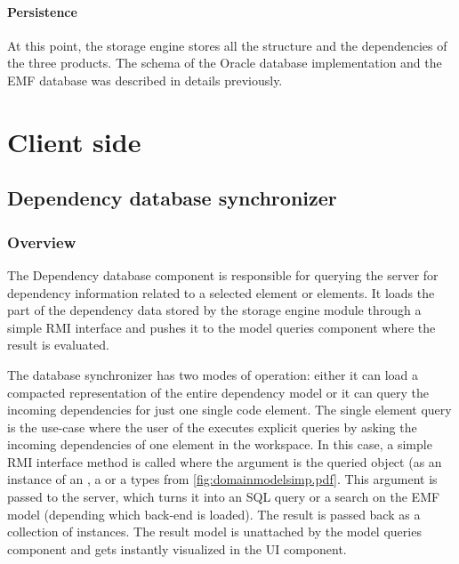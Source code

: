 \paragraph{Persistence}
At this point, the storage engine stores all the structure and the dependencies 
of the three products. The schema of the Oracle database implementation and the EMF
database was described in details previously.



\section{Client side}
\subsection{Dependency database synchronizer}
\label{sect:depdbsynch}

\subsubsection{Overview}
The Dependency database component is responsible for querying the server for
dependency information related to a selected element or elements. It loads the
part of the dependency data stored by the storage engine module through a
simple RMI interface and pushes it to the model queries component where the
result is evaluated.

The database synchronizer has two modes of operation: either it can load a compacted
representation of the entire dependency model or it can query the incoming
dependencies for just one single code element.
The single element query is the use-case where the user of the \ptool{} executes
explicit queries by asking the incoming dependencies of one element in the
workspace. In this case, a simple RMI interface method is called where the
argument is the queried object (as an instance of an , a  or a
 types from \autoref{fig:domainmodelsimp.pdf}. This argument is passed to
the server, which turns it into an SQL query or a search on the EMF model
(depending which back-end is loaded). The result is passed back as a collection
of  instances. The result model is unattached by the model
queries component and gets instantly visualized in the UI component.

